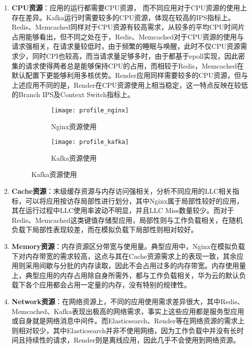 \begin{enumerate}
    \item \textbf{CPU资源}：应用的运行都需要CPU资源， 而不同应用对于CPU资源的使用上存在差异。Kafka运行时需要较多的CPU资源，体现在较高的IPS指标上。Redis、Memcached同样对于CPU资源有较高需求，从较多的平均CPU时间片占用能够看出，但不同之处在于，Redis、Memcached对于CPU资源的使用与请求强相关，在请求量较低时，由于频繁的睡眠与唤醒，此时不仅CPU资源需求少，同时CPI也较高，而当请求量足够多时，由于都基于epoll实现，因此密集的请求使得两者总是能够保持CPU的占用，而相较于Redis，Memcached在默认配置下更能够利用多核优势。Render应用同样需要较多的CPU资源，但与上述应用不同的是，Render在CPU资源使用上相当稳定，这一特点反映在较低的Branch IPS及Context Switch指标上。

\begin{figure}[H]
    \centering
    \begin{subfigure}[b]{0.85\textwidth}
      \texttt{[image: profile\_nginx]}
      \caption{Nginx资源使用}
      \label{fig:profile_nginx}
    \end{subfigure}
    \begin{subfigure}[b]{0.85\textwidth}
        \texttt{[image: profile\_kafka]}
        \caption{Kafka资源使用}
        \label{fig:profile_kafka}
    \end{subfigure}
\label{fig:resource_affinity_1}
\end{figure}

    \item \textbf{Cache资源}：末级缓存资源与内存访问强相关，分析不同应用的LLC相关指标，可以将应用按访存局部性进行划分，其中Nginx属于局部性较好的应用，其在运行过程中LLC使用率波动不明显，并且LLC Miss数量较少。而对于Redis、Memcached这类键值存储型应用，局部性则与工作负载相关，在随机负载下局部性表现较差，而在模拟负载下局部性则相对较好。
    
    \item \textbf{Memory资源}：内存资源区分带宽与使用量。典型应用中，Nginx在模拟负载下对内存带宽的需求较高，这点与其在Cache资源需求上的表现一致，其余应用则采用间歇与分批的内存读取，因此不会占用过多的内存带宽。内存使用量上，典型应用的内存占用除自身所需外，都与工作负载相关，华为云的默认负载下各个应用都会占用一定量的内存，没有特别的规律性。
    
    \item \textbf{Network资源}：在网络资源上，不同的应用使用需求差异很大，其中Redis、Memcached、Kafka表现出极高的网络需求，事实上这些应用都是服务型应用或自身就是网络消息中间件。而Elasticsearch、Render等在网络资源的需求上则相对较少，其中Elasticsearch并非不使用网络，因为工作负载中并没有长时间且持续性的请求，Render则是离线应用，因此几乎不会使用到网络资源。


\end{enumerate}
